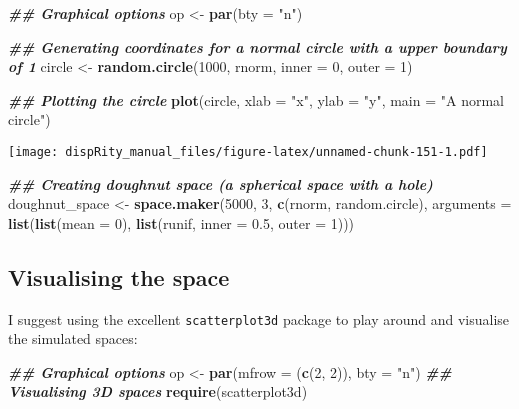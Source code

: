 \documentclass[
]{book}
\newenvironment{Shaded}{\begin{snugshade}}{\end{snugshade}}
\newcommand{\AttributeTok}[1]{\textcolor[rgb]{0.13,0.29,0.53}{#1}}
\newcommand{\DecValTok}[1]{\textcolor[rgb]{0.00,0.00,0.81}{#1}}
\newcommand{\DocumentationTok}[1]{\textcolor[rgb]{0.56,0.35,0.01}{\textbf{\textit{#1}}}}
\newcommand{\FloatTok}[1]{\textcolor[rgb]{0.00,0.00,0.81}{#1}}
\newcommand{\FunctionTok}[1]{\textcolor[rgb]{0.13,0.29,0.53}{\textbf{#1}}}
\newcommand{\NormalTok}[1]{#1}
\newcommand{\OtherTok}[1]{\textcolor[rgb]{0.56,0.35,0.01}{#1}}
\newcommand{\StringTok}[1]{\textcolor[rgb]{0.31,0.60,0.02}{#1}}
\begin{document}
\begin{Shaded}
\begin{Highlighting}[]
\DocumentationTok{\#\# Graphical options}
\NormalTok{op }\OtherTok{\textless{}{-}} \FunctionTok{par}\NormalTok{(}\AttributeTok{bty =} \StringTok{"n"}\NormalTok{)}

\DocumentationTok{\#\# Generating coordinates for a normal circle with a upper boundary of 1}
\NormalTok{circle }\OtherTok{\textless{}{-}} \FunctionTok{random.circle}\NormalTok{(}\DecValTok{1000}\NormalTok{, rnorm, }\AttributeTok{inner =} \DecValTok{0}\NormalTok{, }\AttributeTok{outer =} \DecValTok{1}\NormalTok{)}

\DocumentationTok{\#\# Plotting the circle}
\FunctionTok{plot}\NormalTok{(circle, }\AttributeTok{xlab =} \StringTok{"x"}\NormalTok{, }\AttributeTok{ylab =} \StringTok{"y"}\NormalTok{, }\AttributeTok{main =} \StringTok{"A normal circle"}\NormalTok{)}
\end{Highlighting}
\end{Shaded}

\texttt{[image: dispRity\_manual\_files/figure-latex/unnamed-chunk-151-1.pdf]}

\begin{Shaded}
\begin{Highlighting}[]
\DocumentationTok{\#\# Creating doughnut space (a spherical space with a hole)}
\NormalTok{doughnut\_space }\OtherTok{\textless{}{-}} \FunctionTok{space.maker}\NormalTok{(}\DecValTok{5000}\NormalTok{, }\DecValTok{3}\NormalTok{, }\FunctionTok{c}\NormalTok{(rnorm, random.circle),}
     \AttributeTok{arguments =} \FunctionTok{list}\NormalTok{(}\FunctionTok{list}\NormalTok{(}\AttributeTok{mean =} \DecValTok{0}\NormalTok{),}
                      \FunctionTok{list}\NormalTok{(runif, }\AttributeTok{inner =} \FloatTok{0.5}\NormalTok{, }\AttributeTok{outer =} \DecValTok{1}\NormalTok{)))}
\end{Highlighting}
\end{Shaded}

\hypertarget{visualising-the-space}{%
\subsection{Visualising the space}\label{visualising-the-space}}

I suggest using the excellent \texttt{scatterplot3d} package to play around and visualise the simulated spaces:

\begin{Shaded}
\begin{Highlighting}[]
\DocumentationTok{\#\# Graphical options}
\NormalTok{op }\OtherTok{\textless{}{-}} \FunctionTok{par}\NormalTok{(}\AttributeTok{mfrow =}\NormalTok{ (}\FunctionTok{c}\NormalTok{(}\DecValTok{2}\NormalTok{, }\DecValTok{2}\NormalTok{)), }\AttributeTok{bty =} \StringTok{"n"}\NormalTok{)}
\DocumentationTok{\#\# Visualising 3D spaces}
\FunctionTok{require}\NormalTok{(scatterplot3d)}
\end{Highlighting}
\end{Shaded}
\end{document}
